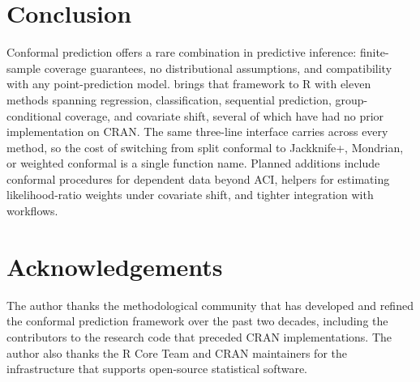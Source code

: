 \section{Conclusion}\label{conclusion}

Conformal prediction offers a rare combination in predictive inference:
finite-sample coverage guarantees, no distributional assumptions, and
compatibility with any point-prediction model. 
brings that framework to R with eleven methods spanning regression,
classification, sequential prediction, group-conditional coverage, and
covariate shift, several of which have had no prior implementation on
CRAN. The same three-line interface carries across every method, so the
cost of switching from split conformal to Jackknife+, Mondrian, or
weighted conformal is a single function name. Planned additions include conformal procedures for dependent data
beyond ACI, helpers for estimating likelihood-ratio weights under
covariate shift, and tighter integration with 
workflows.

\section*{Acknowledgements}\label{acknowledgements}

The author thanks the methodological community that has developed and
refined the conformal prediction framework over the past two decades,
including the contributors to the research code that preceded CRAN
implementations. The author also thanks the R Core Team and CRAN
maintainers for the infrastructure that supports open-source statistical
software.



\address{%
Charles Coverdale\\
Independent\\%
London, United Kingdom\\
%
\url{https://github.com/charlescoverdale/predictset}\\%
%
\href{mailto:charles.f.coverdale@gmail.com}{\nolinkurl{charles.f.coverdale@gmail.com}}%
}
